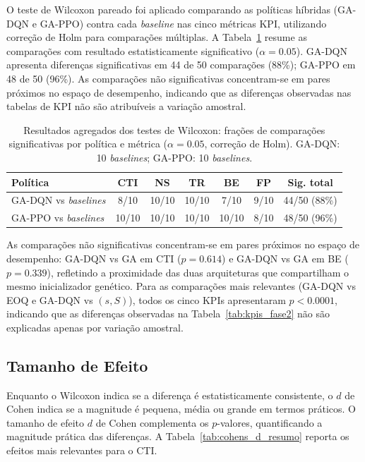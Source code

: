 O teste de Wilcoxon pareado foi aplicado comparando as políticas híbridas (GA-DQN e GA-PPO) contra cada \textit{baseline} nas cinco métricas KPI, utilizando correção de Holm para comparações múltiplas. A Tabela~\ref{tab:wilcoxon_resumo} resume as comparações com resultado estatisticamente significativo ($\alpha = 0.05$). GA-DQN apresenta diferenças significativas em 44 de 50 comparações (88\%); GA-PPO em 48 de 50 (96\%). As comparações não significativas concentram-se em pares próximos no espaço de desempenho, indicando que as diferenças observadas nas tabelas de KPI não são atribuíveis a variação amostral.

\begin{table}[ht]
\centering
\small
\caption{Resultados agregados dos testes de Wilcoxon: frações de comparações significativas por política e métrica ($\alpha=0.05$, correção de Holm). GA-DQN: 10 \textit{baselines}; GA-PPO: 10 \textit{baselines}.}
\label{tab:wilcoxon_resumo}
\begin{tabular}{@{}lcccccc@{}}
\toprule
Política & CTI & NS & TR & BE & FP & Sig. total \\
\midrule
GA-DQN vs \textit{baselines} & 8/10 & 10/10 & 10/10 & 7/10 & 9/10 & 44/50 (88\%) \\
GA-PPO vs \textit{baselines} & 10/10 & 10/10 & 10/10 & 10/10 & 8/10 & 48/50 (96\%) \\
\bottomrule
\end{tabular}
\end{table}

As comparações não significativas concentram-se em pares próximos no espaço de desempenho: GA-DQN vs GA em CTI ($p=0.614$) e GA-DQN vs GA em BE ($p=0.339$), refletindo a proximidade das duas arquiteturas que compartilham o mesmo inicializador genético. Para as comparações mais relevantes (GA-DQN vs EOQ e GA-DQN vs $(s,S)$), todos os cinco KPIs apresentaram $p < 0.0001$, indicando que as diferenças observadas na Tabela~\ref{tab:kpis_fase2} não são explicadas apenas por variação amostral.

\subsection{Tamanho de Efeito}

Enquanto o Wilcoxon indica se a diferença é estatisticamente consistente, o $d$ de Cohen indica se a magnitude é pequena, média ou grande em termos práticos. O tamanho de efeito $d$ de Cohen complementa os $p$-valores, quantificando a magnitude prática das diferenças. A Tabela~\ref{tab:cohens_d_resumo} reporta os efeitos mais relevantes para o CTI.

